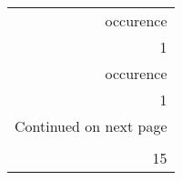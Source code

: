 \begin{longtable}{r}
\toprule
 occurence \\
         1 \\
\midrule
\endfirsthead

\toprule
 occurence \\
         1 \\
\midrule
\endhead
\midrule
\multicolumn{1}{r}{{Continued on next page}} \\
\midrule
\endfoot

\bottomrule
\endlastfoot
         1 \\
        15 \\
\end{longtable}
